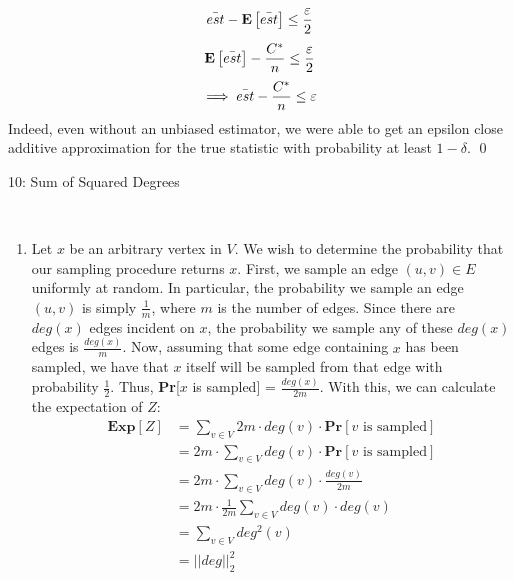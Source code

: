 \documentclass[12pt]{article}
\begin{document}
\begin{solution}
\begin{enumerate}[label=(\alph*)]
    \[
    \Bar{est} - \Exp{\Bar{est}}  \leq \frac{\epsilon}{2}
    \]
    \[
    \Exp{\Bar{est}} - \frac{C^*}{n} \leq \frac{\epsilon}{2}
    \]
    \[
    \implies \Bar{est}- \frac{C^*}{n} \leq \epsilon
    \]
    Indeed, even without an unbiased estimator, we were able to get an epsilon close additive approximation for the true statistic with probability at least $1-\delta$. \qed
   
    
    
\end{enumerate}
\end{solution}

\begin{problem}{10: Sum of Squared Degrees}

\end{problem}
\begin{solution} \ \\

\begin{enumerate}[label=(\alph*)]
    \item Let $x$ be an arbitrary vertex in $V$. We wish to determine the probability that our sampling procedure returns $x$. First, we sample an edge $(u, v) \in E$ uniformly at random. In particular, the probability we sample an edge $(u, v)$ is simply $\frac{1}{m}$, where $m$ is the number of edges. Since there are $deg(x)$ edges incident on $x$, the probability we sample any of these $deg(x)$ edges is $\frac{deg(x)}{m}$. Now, assuming that some edge containing $x$ has been sampled, we have that $x$ itself will be sampled from that edge with probability $\frac{1}{2}$. Thus, \textbf{Pr}[$x$ is sampled] = $\frac{deg(x)}{2m}$. With this, we can calculate the expectation of $Z$:
    \begin{align*}
        \textbf{Exp}[Z] &= \sum\limits_{v \in V} 2m \cdot deg(v) \cdot \textbf{Pr}[v \text{ is sampled}] \\
        &= 2m \cdot \sum\limits_{v \in V} deg(v) \cdot \textbf{Pr}[v \text{ is sampled}] \\
        &= 2m \cdot \sum\limits_{v \in V} deg(v) \cdot \frac{deg(v)}{2m} \\
        &= 2m \cdot \frac{1}{2m} \sum\limits_{v \in V} deg(v) \cdot deg(v) \\
        &= \sum\limits_{v \in V} deg^2(v) \\
        &= ||deg||_2^2
    \end{align*}


\end{enumerate}
\end{solution}
\end{document}

